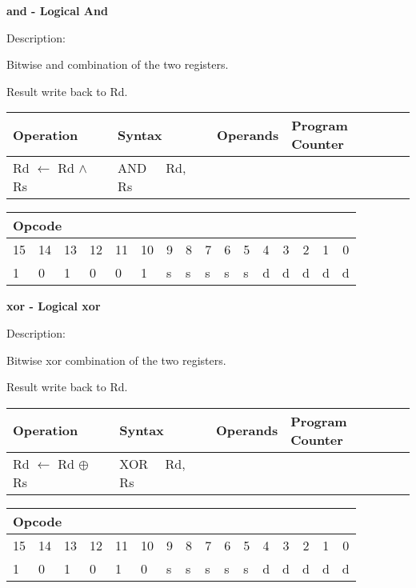 \documentclass{article}
\begin{document}
\bigskip

\textbf{and - Logical And}

Description:

Bitwise and combination of the two registers.

Result write back to Rd.

\begin{tabular}{|l|l|l|l|}
\hline
Operation & Syntax & Operands & Program Counter \\ \hline
Rd $\leftarrow $ Rd $\wedge $ Rs & AND\ \ \ Rd, Rs &  &  \\ \hline
\end{tabular}

\begin{tabular}{|c|c|c|c|c|c|c|c|c|c|c|c|c|c|c|c|}
\hline
\multicolumn{6}{|l|}{Opcode} & \multicolumn{5}{|l|}{} & \multicolumn{5}{|l|}{
} \\ \hline
15 & 14 & 13 & 12 & 11 & 10 & 9 & 8 & 7 & 6 & 5 & 4 & 3 & 2 & 1 & 0 \\ \hline
\multicolumn{1}{|l|}{1} & \multicolumn{1}{|l|}{0} & \multicolumn{1}{|l|}{1}
& \multicolumn{1}{|l|}{0} & \multicolumn{1}{|l|}{0} & \multicolumn{1}{|l|}{1}
& \multicolumn{1}{|l|}{s} & \multicolumn{1}{|l|}{s} & \multicolumn{1}{|l|}{s}
& \multicolumn{1}{|l|}{s} & \multicolumn{1}{|l|}{s} & \multicolumn{1}{|l|}{d}
& \multicolumn{1}{|l|}{d} & \multicolumn{1}{|l|}{d} & \multicolumn{1}{|l|}{d}
& \multicolumn{1}{|l|}{d} \\ \hline
\end{tabular}

\bigskip

\textbf{xor - Logical xor}

Description:

Bitwise xor combination of the two registers.

Result write back to Rd.

\begin{tabular}{|l|l|l|l|}
\hline
Operation & Syntax & Operands & Program Counter \\ \hline
Rd $\leftarrow $ Rd $\oplus $ Rs & XOR \ \ Rd, Rs &  &  \\ \hline
\end{tabular}

\begin{tabular}{|c|c|c|c|c|c|c|c|c|c|c|c|c|c|c|c|}
\hline
\multicolumn{6}{|l|}{Opcode} & \multicolumn{5}{|l|}{} & \multicolumn{5}{|l|}{
} \\ \hline
15 & 14 & 13 & 12 & 11 & 10 & 9 & 8 & 7 & 6 & 5 & 4 & 3 & 2 & 1 & 0 \\ \hline
\multicolumn{1}{|l|}{1} & \multicolumn{1}{|l|}{0} & \multicolumn{1}{|l|}{1}
& \multicolumn{1}{|l|}{0} & \multicolumn{1}{|l|}{1} & \multicolumn{1}{|l|}{0}
& \multicolumn{1}{|l|}{s} & \multicolumn{1}{|l|}{s} & \multicolumn{1}{|l|}{s}
& \multicolumn{1}{|l|}{s} & \multicolumn{1}{|l|}{s} & \multicolumn{1}{|l|}{d}
& \multicolumn{1}{|l|}{d} & \multicolumn{1}{|l|}{d} & \multicolumn{1}{|l|}{d}
& \multicolumn{1}{|l|}{d} \\ \hline
\end{tabular}
\end{document}
